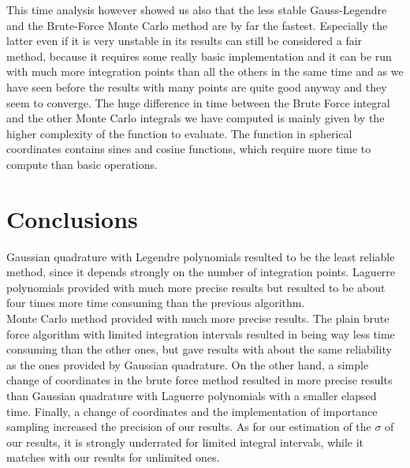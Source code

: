 \documentclass[10pt,a4paper,titlepage]{article}
\begin{document}
This time analysis however showed us also that the less stable Gauss-Legendre and the Brute-Force Monte Carlo method are by far the fastest. Especially the latter even if it is very unstable in its results can still be considered a fair method, because it requires some really basic implementation and it can be run with much more integration points than all the others in the same time and as we have seen before the results with many points are quite good anyway and they seem to converge. The huge difference in time between the Brute Force integral and the other Monte Carlo integrals we have computed is mainly given by the higher complexity of the function to evaluate. The function in spherical coordinates contains sines and cosine functions, which require more time to compute than basic operations.\\

\section{Conclusions}
Gaussian quadrature with Legendre polynomials resulted to be the least reliable method, since it depends strongly on the number of integration points. Laguerre polynomials provided with much more precise results but resulted to be about four times more time consuming than the previous algorithm. 
\\ Monte Carlo method provided with much more precise results. The plain brute force algorithm with limited integration intervals resulted in being way less time consuming than the other ones, but gave results with about the same reliability as the ones provided by Gaussian quadrature. On the other hand, a simple change of coordinates in the brute force method resulted in more precise results than Gaussian quadrature with Laguerre polynomials with a smaller elapsed time. Finally, a change of coordinates and the implementation of importance sampling increased the precision of our results.
As for our estimation of the $\sigma$ of our results, it is strongly underrated for limited integral intervals, while it matches with our results for unlimited ones. 
\newpage
\end{document}
